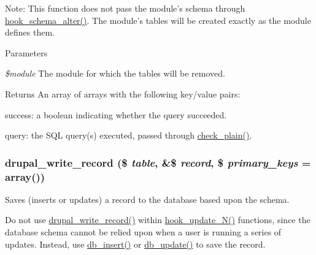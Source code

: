 Note: This function does not pass the module's schema through \hyperlink{group__schemaapi_ga4a00aaeabd6903f707d8385476b9ae2a}{hook\_\-schema\_\-alter()}. The module's tables will be created exactly as the module defines them.


\begin{DoxyParams}{Parameters}
\item[{\em \$module}]The module for which the tables will be removed.\end{DoxyParams}
\begin{DoxyReturn}{Returns}
An array of arrays with the following key/value pairs:
\begin{DoxyItemize}
\item success: a boolean indicating whether the query succeeded.
\item query: the SQL query(s) executed, passed through \hyperlink{group__sanitization_ga76fc67a30fd8d75ddd80565e6e65a13d}{check\_\-plain()}. 
\end{DoxyItemize}
\end{DoxyReturn}
\hypertarget{group__schemaapi_ga96f707de751a962bf21b6cb0cb4f2ae6}{
\subsubsection[{drupal\_\-write\_\-record}]{\setlength{\rightskip}{0pt plus 5cm}drupal\_\-write\_\-record (\$ {\em table}, \/  \&\$ {\em record}, \/  \$ {\em primary\_\-keys} = {\ttfamily array()})}}
\label{group__schemaapi_ga96f707de751a962bf21b6cb0cb4f2ae6}
Saves (inserts or updates) a record to the database based upon the schema.

Do not use \hyperlink{group__schemaapi_ga96f707de751a962bf21b6cb0cb4f2ae6}{drupal\_\-write\_\-record()} within \hyperlink{group__hooks_ga908950689e6b85cd0fae3b780d69a41f}{hook\_\-update\_\-N()} functions, since the database schema cannot be relied upon when a user is running a series of updates. Instead, use \hyperlink{group__database_gaadfbffaf30ff5eb14f1bd88619351345}{db\_\-insert()} or \hyperlink{group__database_ga40967197ee5d6a23a5c5a77e627067fe}{db\_\-update()} to save the record.


